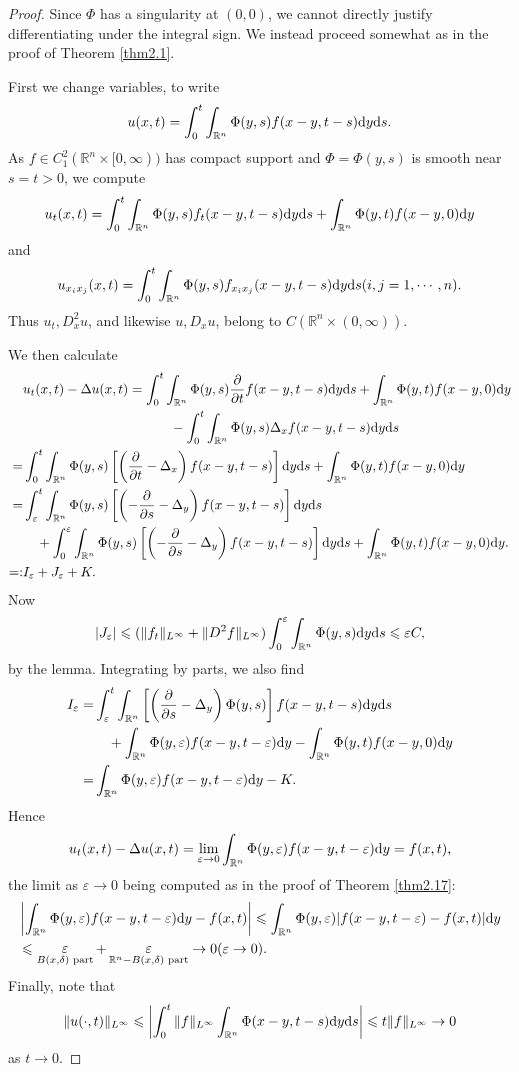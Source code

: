 \documentclass[hyperref,UTF8,12pt]{article}
\numberwithin{equation}{subsection}
\theoremstyle{plain}
\theoremstyle{definition}
\numberwithin{theorem}{section}
\numberwithin{lemma}{section}
\numberwithin{proposition}{section}
\numberwithin{remark}{section}
\numberwithin{corollary}{section}
\numberwithin{definition}{section}
\numberwithin{problem}{section}
\numberwithin{example}{section}
\def\dif{\textup{d}}
\newcommand{\ptl}{\partial}
\newcommand{\mr}{\mathbb{R}}
\renewcommand{\leq}{\leqslant}
\newcommand{\ve}{\varepsilon}
\begin{document}
\begin{proof}
Since $\Phi$ has a singularity at $(0,0)$, we cannot directly justify differentiating under the integral sign. We instead proceed somewhat as in the proof of Theorem \ref{thm2.1}.

First we change variables, to write\[u(x,t)=\int_0^t\int_{\mr^n}\Phi(y,s)f(x-y,t-s)\dif y\dif s.\]As $f\in C_1^2(\mr^n\times[0,\infty))$ has compact support and $\Phi=\Phi(y,s)$ is smooth near $s=t>0$, we compute
\[u_t(x, t)=\int_0^t\int_{\mr^n}\Phi(y,s)f_t(x-y,t-s)\dif y\dif s+\int_{\mr^n}\Phi(y,t) f(x-y,0)\dif y\]and\[u_{x_ix_j}(x,t)=\int_0^t\int_{\mr^n}\Phi(y,s)f_{x_ix_j}(x-y,t-s)\dif y\dif s(i,j=1,\cdots,n).\]Thus $u_t,D_x^2u$, and likewise $u,D_xu$, belong to $C(\mr^n\times(0,\infty))$.

We then calculate\[\begin{aligned}
	&u_t(x,t)-\Delta u(x,t)=\int_0^t\int_{\mr^n}\Phi(y,s)\frac{\ptl}{\ptl t}f(x-y,t-s)\dif y\dif s+\int_{\mr^n}\Phi(y,t)f(x-y,0)\dif y\\
	&\qquad\qquad\qquad\qquad\qquad\quad-\int_0^t\int_{\mr^n}\Phi(y,s)\Delta_xf(x-y,t-s)\dif y\dif s\\
	=&\int_0^t\int_{\mr^n}\Phi(y,s)\left[\left(\frac{\ptl}{\ptl t}-\Delta_x\right)f(x-y,t-s)\right]\dif y\dif s+\int_{\mr^n}\Phi(y,t)f(x-y,0)\dif y\\
	=&\int_\ve^t\int_{\mr^n}\Phi(y,s)\left[\left(-\frac{\ptl}{\ptl s}-\Delta_y\right) f(x-y,t-s)\right]\dif y\dif s\\
	&\quad+\int_0^\ve\int_{\mr^n}\Phi(y,s)\left[\left(-\frac{\ptl}{\ptl s}-\Delta_y\right)f(x-y,t-s)\right]\dif y\dif s+\int_{\mr^n}\Phi(y,t)f(x-y,0)\dif y.\\
	=:&I_\ve+J_\ve+K.
\end{aligned}\]Now
\[|J_\ve|\leq(\|f_t\|_{L^\infty}+\|D^2 f\|_{L^\infty})\int_0^\ve\int_{\mr^n}\Phi(y,s) \dif y\dif s\leq\ve C,\] by the lemma. Integrating by parts, we also find\[\begin{aligned}
	I_\ve=&\int_\ve^t\int_{\mr^n}\left[\left(\frac{\ptl}{\ptl s}-\Delta_y\right)\Phi(y, s)\right]f(x-y,t-s)\dif y\dif s\\
	&\quad+\int_{\mr^n}\Phi(y,\ve)f(x-y,t-\ve)\dif y-\int_{\mr^n}\Phi(y,t)f(x-y,0)\dif y\\
	=&\int_{\mr^n}\Phi(y,\ve)f(x-y,t-\ve)\dif y-K.
\end{aligned}\]Hence\[u_t(x,t)-\Delta u(x,t)=\lim_{\ve\to0}\int_{\mr^n}\Phi(y,\ve)f(x-y, t-\ve)\dif y=f(x,t),\]the limit as $\ve\to0$ being computed as in the proof of Theorem \ref{thm2.17}:\[\begin{aligned}
&\left|\int_{\mr^n}\Phi(y,\ve)f(x-y,t-\ve)\dif y-f(x,t)\right|\leq\int_{\mr^n}\Phi(y,\ve) |f(x-y,t-\ve)-f(x,t)|\dif y\\ &\leq\mathop{\ve}_{B(x,\delta)\text{ part}}+\mathop{\ve}_{\mr^n-B(x,\delta)\text{ part}}\to0(\ve\to0).
\end{aligned}\]Finally, note that \[\|u(\cdot,t)\|_{L^\infty}\leq\left|\int_0^t\|f\|_{L^\infty}\int_{\mr^n}\Phi(x-y,t-s)\dif y\dif s\right|\leq t\|f\|_{L^\infty}\to0\]as $t\to0$.
\end{proof}
\end{document}

